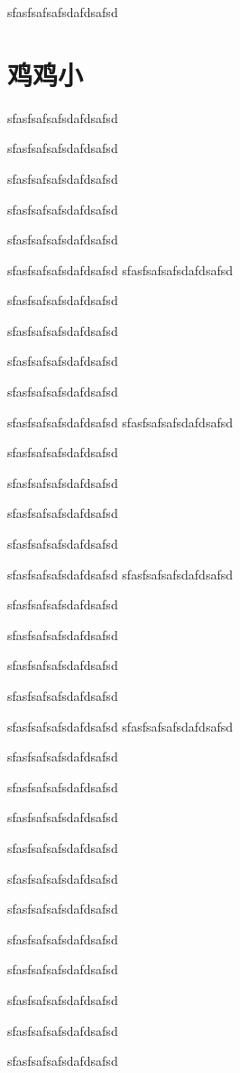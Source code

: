 \documentclass[hyperref,UTF8]{ctexrep}
\newenvironment{thisBody}
	{
		\zihao{3}
	}%
	{
		\clearpage
	}%
\begin{document}
	\begin{thisBody} 
		sfasfsafsafsdafdsafsd
	\end{thisBody}
\section{鸡鸡小}
	\begin{thisBody}
			sfasfsafsafsdafdsafsd
		
		sfasfsafsafsdafdsafsd
		
		sfasfsafsafsdafdsafsd
		
		sfasfsafsafsdafdsafsd
		
		sfasfsafsafsdafdsafsd
		
		
		sfasfsafsafsdafdsafsd
			sfasfsafsafsdafdsafsd
		
		sfasfsafsafsdafdsafsd
		
		sfasfsafsafsdafdsafsd
		
		sfasfsafsafsdafdsafsd
		
		sfasfsafsafsdafdsafsd
		
		
		sfasfsafsafsdafdsafsd
			sfasfsafsafsdafdsafsd
		
		sfasfsafsafsdafdsafsd
		
		sfasfsafsafsdafdsafsd
		
		sfasfsafsafsdafdsafsd
		
		sfasfsafsafsdafdsafsd
		
		
		sfasfsafsafsdafdsafsd
			sfasfsafsafsdafdsafsd
		
		sfasfsafsafsdafdsafsd
		
		sfasfsafsafsdafdsafsd
		
		sfasfsafsafsdafdsafsd
		
		sfasfsafsafsdafdsafsd
		
		
		sfasfsafsafsdafdsafsd
			sfasfsafsafsdafdsafsd
		
		sfasfsafsafsdafdsafsd
		
		sfasfsafsafsdafdsafsd
		
		sfasfsafsafsdafdsafsd
		
		sfasfsafsafsdafdsafsd
		
		
		sfasfsafsafsdafdsafsd
		 
		sfasfsafsafsdafdsafsd
		
			sfasfsafsafsdafdsafsd
			
				sfasfsafsafsdafdsafsd
				
					sfasfsafsafsdafdsafsd
					
						sfasfsafsafsdafdsafsd
						
						
							sfasfsafsafsdafdsafsd
	\end{thisBody}
\end{document}
